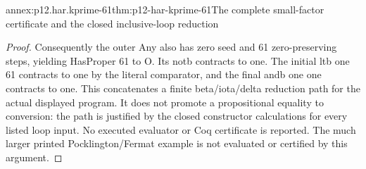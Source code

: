 \begin{annexitem}{annex:p12.har.kprime-61}{thm:p12-har-kprime-61}{The complete small-factor certificate and the closed inclusive-loop reduction}
\begin{proof}
Consequently the outer Any also has zero seed and 61 zero-preserving
steps, yielding HasProper 61 to O. Its notb contracts to one.
The initial ltb one 61 contracts to one by the literal comparator,
and the final andb one one contracts to one. This concatenates a
finite beta/iota/delta reduction path for the actual displayed program.
It does not promote a propositional equality to conversion: the
path is justified by the closed constructor calculations for every
listed loop input. No executed evaluator or Coq certificate is reported.
The much larger printed Pocklington/Fermat example is not evaluated
or certified by this argument.
\end{proof}
\end{annexitem}
